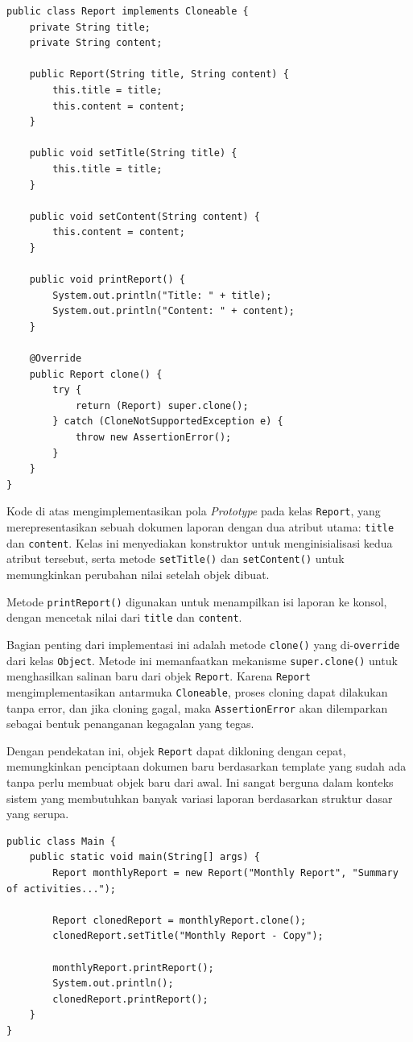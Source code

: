 \begin{lstlisting}[style=JavaStyle, caption={Implementasi Prototype pada Kelas Report}, label={lst:prototype-report}]
public class Report implements Cloneable {
	private String title;
	private String content;
	
	public Report(String title, String content) {
		this.title = title;
		this.content = content;
	}
	
	public void setTitle(String title) {
		this.title = title;
	}
	
	public void setContent(String content) {
		this.content = content;
	}
	
	public void printReport() {
		System.out.println("Title: " + title);
		System.out.println("Content: " + content);
	}
	
	@Override
	public Report clone() {
		try {
			return (Report) super.clone();
		} catch (CloneNotSupportedException e) {
			throw new AssertionError();
		}
	}
}
\end{lstlisting}

Kode di atas mengimplementasikan pola \textit{Prototype} pada kelas \texttt{Report}, yang merepresentasikan sebuah dokumen laporan dengan dua atribut utama: \texttt{title} dan \texttt{content}. Kelas ini menyediakan konstruktor untuk menginisialisasi kedua atribut tersebut, serta metode \texttt{setTitle()} dan \texttt{setContent()} untuk memungkinkan perubahan nilai setelah objek dibuat.

Metode \texttt{printReport()} digunakan untuk menampilkan isi laporan ke konsol, dengan mencetak nilai dari \texttt{title} dan \texttt{content}. 

Bagian penting dari implementasi ini adalah metode \texttt{clone()} yang di-\texttt{override} dari kelas \texttt{Object}. Metode ini memanfaatkan mekanisme \texttt{super.clone()} untuk menghasilkan salinan baru dari objek \texttt{Report}. Karena \texttt{Report} mengimplementasikan antarmuka \texttt{Cloneable}, proses cloning dapat dilakukan tanpa error, dan jika cloning gagal, maka \texttt{AssertionError} akan dilemparkan sebagai bentuk penanganan kegagalan yang tegas.

Dengan pendekatan ini, objek \texttt{Report} dapat dikloning dengan cepat, memungkinkan penciptaan dokumen baru berdasarkan template yang sudah ada tanpa perlu membuat objek baru dari awal. Ini sangat berguna dalam konteks sistem yang membutuhkan banyak variasi laporan berdasarkan struktur dasar yang serupa.

\begin{lstlisting}[style=JavaStyle, caption={Penggunaan Prototype untuk Mengkloning Report}, label={lst:prototype-report-main}]
public class Main {
	public static void main(String[] args) {
		Report monthlyReport = new Report("Monthly Report", "Summary of activities...");
		
		Report clonedReport = monthlyReport.clone();
		clonedReport.setTitle("Monthly Report - Copy");
		
		monthlyReport.printReport();
		System.out.println();
		clonedReport.printReport();
	}
}
\end{lstlisting}

